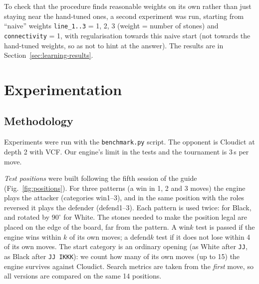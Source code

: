 \documentclass[a4paper,10pt,twocolumn]{article}
\newcommand{\code}[1]{\texttt{#1}}
\begin{document}
To check that the procedure finds reasonable weights on its own rather than just staying near the hand-tuned ones, a second experiment was run, starting from ``naive'' weights \code{line\_1..3} = 1, 2, 3 (weight = number of stones) and \code{connectivity} = 1, with regularisation towards this naive start (not towards the hand-tuned weights, so as not to hint at the answer). The results are in Section~\ref{sec:learning-results}.

\section{Experimentation}\label{sec:exp}

\subsection{Methodology}
Experiments were run with the \code{benchmark.py} script. The opponent is Cloudict at depth 2 with VCF. Our engine's limit in the tests and the tournament is 3\,s per move. 

\emph{Test positions} were built following the fifth session of the guide (Fig.~\ref{fig:positions}). For three patterns (a win in 1, 2 and 3 moves) the engine plays the attacker (categories win1--3), and in the same position with the roles reversed it plays the defender (defend1--3). Each pattern is used twice: for Black, and rotated by $90^\circ$ for White. The stones needed to make the position legal are placed on the edge of the board, far from the pattern. A win$k$ test is passed if the engine wins within $k$ of its own moves; a defend$k$ test if it does not lose within 4 of its own moves. The start category is an ordinary opening (as White after \code{JJ}, as Black after \code{JJ IKKK}): we count how many of its own moves (up to 15) the engine survives against Cloudict. Search metrics are taken from the \emph{first} move, so all versions are compared on the same 14 positions.
\end{document}

